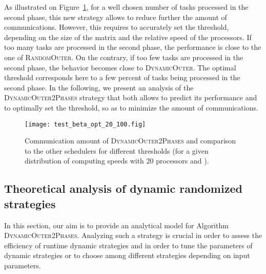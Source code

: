 \documentclass[a4paper,10pt]{article}
\newcommand{\simplerandom}{\textsc{Random\-Outer}\xspace}
\newcommand{\stupid}{\textsc{Dynamic\-Outer}\xspace}
\newcommand{\stupidthreshold}{\textsc{Dynamic\-Outer\-2Phases}\xspace}
\begin{document}
\begin{algorithm}[htbp]
  \DontPrintSemicolon
  \caption{\stupidthreshold strategy.}
  \label{algo.stupidthreshold}
\end{algorithm}


As illustrated on Figure~\ref{fig.threshold}, for a well chosen number
of tasks processed in the second phase, this new strategy allows to
reduce further the amount of communications. However, this requires to
accurately set the threshold, depending on the size of the matrix and
the relative speed of the processors. If too many tasks are processed
in the second phase, the performance is close to the one of
\simplerandom. On the contrary, if too few tasks are processed in the
second phase, the behavior becomes close to \stupid. The optimal
threshold corresponds here to a few percent of tasks being processed
in the second phase. In the following, we present an analysis of the
\stupidthreshold strategy that both allows to predict its performance
and to optimally set the threshold, so as to minimize the amount of
communications.


\begin{figure}[htbp]
  \centering
  \texttt{[image: test\_beta\_opt\_20\_100.fig]}
  \caption{Communication amount of \stupidthreshold and comparison to
    the other schedulers for different thresholds (for a given
    distribution of computing speeds with 20 processors and
    ).}
  \label{fig.threshold}
\end{figure}


\subsection{Theoretical analysis of dynamic randomized strategies} 
\label{outer_analysis}


In this section, our aim is to provide an analytical model for
Algorithm \stupidthreshold. Analyzing such a strategy is crucial in order to
assess the efficiency of runtime dynamic strategies and in order to
tune the parameters of dynamic strategies or to choose among different
strategies depending on input parameters.
\end{document}
